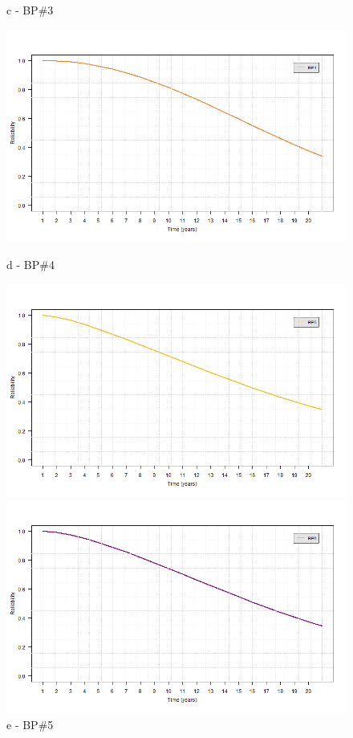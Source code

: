 \begin{figure}[!htb]
\begin{minipage}[b]{0.5\linewidth}
		\caption*{c - BP\#3}
	\end{minipage}
	\hspace{0.05cm}
	\begin{minipage}[b]{0.5\linewidth}
		\centering
		\includegraphics[width=\textwidth]{figures/ch05_fig_sur_pump4}
		\caption*{d - BP\#4}
	\end{minipage}
	\hspace{0.05cm}
	\begin{minipage}[b]{0.5\linewidth}
		\centering
		\includegraphics[width=\textwidth]{figures/ch05_fig_sur_pump5}
		\caption*{e - BP\#5}
	\end{minipage}
	\hspace{0.05cm}
	\begin{minipage}[b]{0.5\linewidth}
		\centering
		\includegraphics[width=\textwidth]{figures/ch05_fig_sur_pump6}

\end{minipage}
\end{figure}
